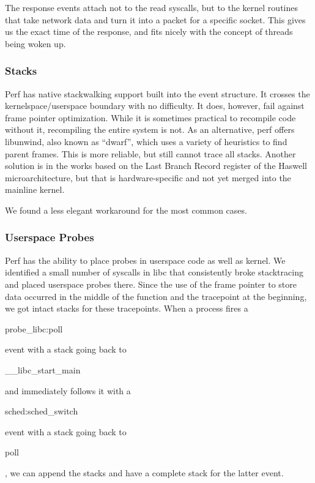 \documentclass[10pt]{article}
\begin{document}
The response events attach not to the read syscalls, but to the kernel routines that take network data and turn it into a packet for a specific socket.  This gives us the exact time of the response, and fits nicely with the concept of threads being woken up.

\subsubsection{Stacks}

Perf has native stackwalking support built into the event structure.  It crosses the kernelspace/userspace boundary with no difficulty.  It does, however, fail against frame pointer optimization.  While it is sometimes practical to recompile code without it, recompiling the entire system is not.  As an alternative, perf offers libunwind, also known as ``dwarf'', which uses a variety of heuristics to find parent frames.  This is more reliable, but still cannot trace all stacks.  Another solution is in the works based on the Last Branch Record register of the Haswell microarchitecture, but that is hardware-specific and not yet merged into the mainline kernel.\cite{lbr}

We found a less elegant workaround for the most common cases.

\subsubsection{Userspace Probes}

Perf has the ability to place probes in userspace code as well as kernel.  We identified a small number of syscalls in libc that consistently broke stacktracing and placed userspace probes there.  Since the use of the frame pointer to store data occurred in the middle of the function and the tracepoint at the beginning, we got intact stacks for these tracepoints.  When a process fires a \begin{tt}probe\_libc:poll\end{tt} event with a stack going back to \begin{tt}\_\_libc\_start\_main\end{tt} and immediately follows it with a \begin{tt}sched:sched\_switch\end{tt} event with a stack going back to \begin{tt}poll\end{tt}, we can append the stacks and have a complete stack for the latter event.
\end{document}
